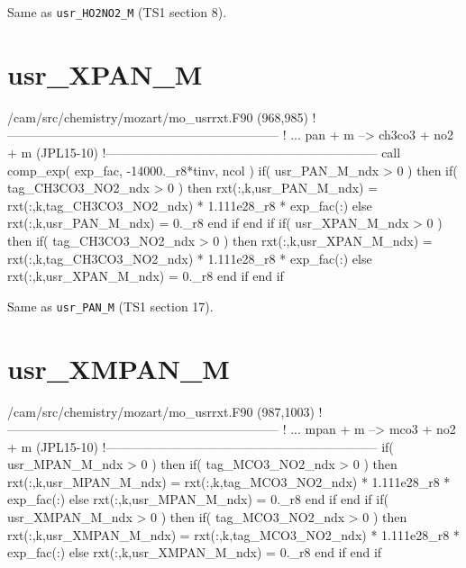 \documentclass[titlepage]{article}
\begin{document}
Same as \verb>usr_HO2NO2_M> (TS1 section 8).


\section{usr\_XPAN\_M}

\begin{blockcode}[commandchars=\\\{\}]
\color{gray}/cam/src/chemistry/mozart/mo_usrrxt.F90 (968,985)
!-----------------------------------------------------------------
! ... pan + m --> ch3co3 + no2 + m (JPL15-10)
!-----------------------------------------------------------------
       call comp_exp( exp_fac, -14000._r8*tinv, ncol )
       if( usr_PAN_M_ndx > 0 ) then
          if( tag_CH3CO3_NO2_ndx > 0 ) then
             rxt(:,k,usr_PAN_M_ndx) = rxt(:,k,tag_CH3CO3_NO2_ndx) * 1.111e28_r8 * exp_fac(:)
          else
             rxt(:,k,usr_PAN_M_ndx) = 0._r8
          end if
       end if
       if( usr_XPAN_M_ndx > 0 ) then
          if( tag_CH3CO3_NO2_ndx > 0 ) then
             rxt(:,k,usr_XPAN_M_ndx) = rxt(:,k,tag_CH3CO3_NO2_ndx) * 1.111e28_r8 * exp_fac(:)
          else
             rxt(:,k,usr_XPAN_M_ndx) = 0._r8
          end if
       end if
\end{blockcode}      

Same as \verb>usr_PAN_M> (TS1 section 17).


\section{usr\_XMPAN\_M}

\begin{blockcode}[commandchars=\\\{\}]
\color{gray}/cam/src/chemistry/mozart/mo_usrrxt.F90 (987,1003)
!-----------------------------------------------------------------
! ... mpan + m --> mco3 + no2 + m (JPL15-10)
!-----------------------------------------------------------------
       if( usr_MPAN_M_ndx > 0 ) then
          if( tag_MCO3_NO2_ndx > 0 ) then
             rxt(:,k,usr_MPAN_M_ndx) = rxt(:,k,tag_MCO3_NO2_ndx) * 1.111e28_r8 * exp_fac(:)
          else
             rxt(:,k,usr_MPAN_M_ndx) = 0._r8
          end if
       end if
       if( usr_XMPAN_M_ndx > 0 ) then
          if( tag_MCO3_NO2_ndx > 0 ) then
             rxt(:,k,usr_XMPAN_M_ndx) = rxt(:,k,tag_MCO3_NO2_ndx) * 1.111e28_r8 * exp_fac(:)
          else
             rxt(:,k,usr_XMPAN_M_ndx) = 0._r8
          end if
       end if
\end{blockcode}      
\end{document}

